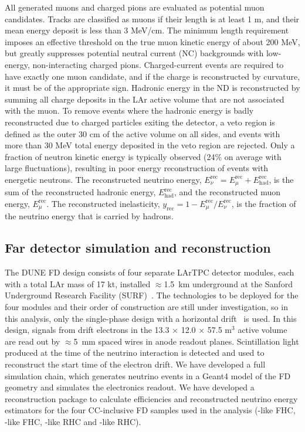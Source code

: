 All generated muons and charged pions are evaluated as potential muon candidates. Tracks are classified as muons if their length is at least 1 m, and their mean energy deposit is less than 3 MeV/cm. The minimum length requirement imposes an effective threshold on the true muon kinetic energy of about 200 MeV, but greatly suppresses potential neutral current (NC) backgrounds with low-energy, non-interacting charged pions. Charged-current events are required to have exactly one muon candidate, and if the charge is reconstructed by curvature, it must be of the appropriate sign. Hadronic energy in the ND is reconstructed by summing all charge deposits in the LAr active volume that are not associated with the muon. To remove events where the hadronic energy is badly reconstructed due to charged particles exiting the detector, a veto region is defined as the outer 30 cm of the active volume on all sides, and events with more than 30 MeV total energy deposited in the veto region are rejected. Only a fraction of neutron kinetic energy is typically observed (24\% on average with large fluctuations), resulting in poor energy reconstruction of events with energetic neutrons. The reconstructed neutrino energy, $E_{\nu}^{\mathrm{rec}} = E_{\mu}^{\mathrm{rec}} + E_{\mathrm{had}}^{\mathrm{rec}}$, is the sum of the reconstructed hadronic energy, $E_{\mathrm{had}}^{\mathrm{rec}}$, and the reconstructed muon energy, $E_{\mu}^{\mathrm{rec}}$. The reconstructed inelasticity, $y_{\mathrm{rec}} = 1 - E_{\mu}^{\mathrm{rec}}/E_{\nu}^{\mathrm{rec}}$, is the fraction of the neutrino energy that is carried by hadrons.

\subsection{Far detector simulation and reconstruction}
\label{sec:fd}
The DUNE FD design consists of four separate LArTPC detector modules, each with a total LAr mass of 17 kt, installed $\approx$1.5~km underground at the Sanford Underground Research Facility (SURF)~\cite{Abi:2018dnh}. The technologies to be deployed for the four modules and their order of construction are still under investigation, so in this analysis, only the single-phase design with a horizontal drift~\cite{Abi:2020loh} is used. In this design, signals from drift electrons in the 13.3 $\times$ 12.0 $\times$ 57.5 m$^{3}$ active volume are read out by $\approx$5~mm spaced wires in anode readout planes. Scintillation light produced at the time of the neutrino interaction is detected and used to reconstruct the start time of the electron drift. We have developed a full simulation chain, which generates neutrino events in a Geant4 model of the FD geometry and simulates the electronics readout. We have developed a reconstruction package to calculate efficiencies and reconstructed neutrino energy estimators for the four CC-inclusive FD samples used in the analysis (\numu-like FHC, \nue-like FHC, \anumu-like RHC and \anue-like RHC).

